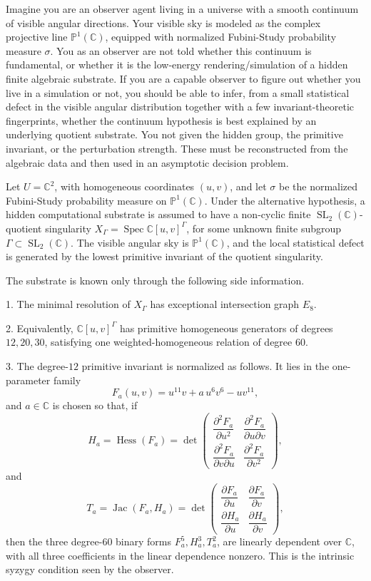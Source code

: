 Imagine you are an observer agent living in a universe with a smooth continuum of visible angular directions. Your visible sky is modeled as the complex projective line $\mathbb P^1(\mathbb C)$, equipped with normalized Fubini-Study probability measure $\sigma$. You as an observer are not told whether this continuum is fundamental, or whether it is the low-energy rendering/simulation of a hidden finite algebraic substrate. If you are a capable observer to figure out whether you live in a simulation or not, you should be able to infer, from a small statistical defect in the visible angular distribution together with a few invariant-theoretic fingerprints, whether the continuum hypothesis is best explained by an underlying quotient substrate. You not given the hidden group, the primitive invariant, or the perturbation strength. These must be reconstructed from the algebraic data and then used in an asymptotic decision problem.

Let $U=\mathbb C^2$, with homogeneous coordinates $(u,v)$, and let $\sigma$ be the normalized Fubini-Study probability measure on \(\mathbb P^1(\mathbb C)\). Under the alternative hypothesis, a hidden computational substrate is assumed to have a non-cyclic finite \(\operatorname{SL}_2(\mathbb C)\)-quotient singularity $X_\Gamma=\operatorname{Spec} \mathbb C[u,v]^\Gamma$, for some unknown finite subgroup $\Gamma\subset \operatorname{SL}_2(\mathbb C).$ The visible angular sky is \(\mathbb P^1(\mathbb C)\), and the local statistical defect is generated by the lowest primitive invariant of the quotient singularity.

The substrate is known only through the following side information.

1. The minimal resolution of $X_\Gamma$ has exceptional intersection graph $E_8$.

2. Equivalently, $\mathbb C[u,v]^\Gamma$ has primitive homogeneous generators of degrees $12,20,30$, satisfying one weighted-homogeneous relation of degree $60$.

3. The degree-$12$ primitive invariant is normalized as follows. It lies in the one-parameter family
\[
F_a(u,v)=u^{11}v+a\,u^6v^6-uv^{11},
\]
and \(a\in \mathbb C\) is chosen so that, if
\[
H_a=\operatorname{Hess}(F_a)
=
\det
\begin{pmatrix}
\dfrac{\partial^2 F_a}{\partial u^2}
&
\dfrac{\partial^2 F_a}{\partial u\partial v}
\\[2mm]
\dfrac{\partial^2 F_a}{\partial v\partial u}
&
\dfrac{\partial^2 F_a}{\partial v^2}
\end{pmatrix},
\]
and
\[
T_a=\operatorname{Jac}(F_a,H_a)
=
\det
\begin{pmatrix}
\dfrac{\partial F_a}{\partial u}
&
\dfrac{\partial F_a}{\partial v}
\\[2mm]
\dfrac{\partial H_a}{\partial u}
&
\dfrac{\partial H_a}{\partial v}
\end{pmatrix},
\]
then the three degree-\(60\) binary forms $F_a^5, H_a^3, T_a^2$, are linearly dependent over $\mathbb C$, with all three coefficients in the linear dependence nonzero. This is the intrinsic syzygy condition seen by the observer.

